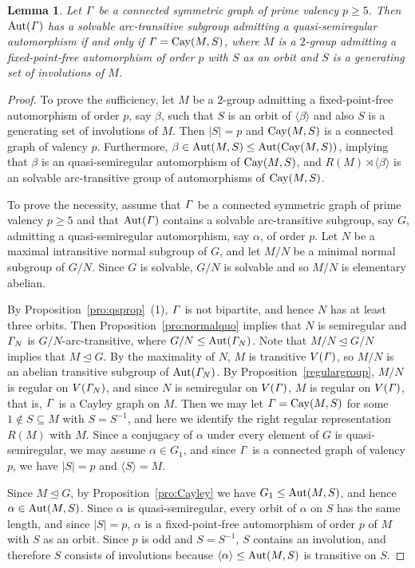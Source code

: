 \documentclass[12pt,reqno]{amsart}
\renewcommand\a{\alpha}  \renewcommand\b{\beta}
\numberwithin {equation} {section}
\newtheorem{lemma}[theorem]{Lemma}
\begin{document}
\begin{lemma}\label{lm:valp1}
 Let ${\it \Gamma}$ be a connected symmetric graph of prime valency $p\geq 5$. Then $\mathrm{Aut}({\it \Gamma})$ has a solvable arc-transitive subgroup admitting a quasi-semiregular automorphism if and only if ${\it \Gamma}=\mathrm{Cay}(M,S)$, where $M$ is a $2$-group admitting a fixed-point-free automorphism of order $p$ with $S$ as an orbit and $S$ is a generating set of involutions of $M$.
 \end{lemma}
\begin{proof} To prove the sufficiency, let $M$ be a $2$-group admitting a fixed-point-free automorphism of order $p$, say $\b$, such that $S$ is an orbit of $\langle \b\rangle$ and also $S$ is a generating set of involutions of $M$. Then $|S|=p$ and $\mathrm{Cay}(M,S)$
is a connected graph of valency $p$. Furthermore, $\b\in \Aut(M,S)\leq \Aut(\Cay(M,S))$, implying that $\b$ is an quasi-semiregular automorphism of $\mathrm{Cay}(M,S)$, and $R(M)\rtimes \langle \b\rangle$ is an solvable arc-transitive group of automorphisms of $\mathrm{Cay}(M,S)$.

To prove the necessity, assume that ${\it \Gamma}$ be a connected symmetric graph of prime valency $p\geq 5$ and that $\mathrm{Aut}({\it \Gamma})$ contains a solvable arc-transitive subgroup, say $G$, admitting a quasi-semiregular automorphism, say $\a$, of order $p$. Let $N$ be a maximal intransitive normal subgroup of $G$, and let $M/N$ be a minimal normal subgroup of $G/N$. Since $G$ is solvable, $G/N$ is solvable and so $M/N$ is elementary abelian.

By Proposition~\ref{pro:qsprop}~(1), ${\it \Gamma}$ is not bipartite, and hence $N$ has at least three orbits. Then Proposition~\ref{pro:normalquo} implies that $N$ is semiregular and ${\it \Gamma}_N$ is $G/N$-arc-transitive, where $G/N\leq \mathrm{Aut}({\it \Gamma}_N)$. Note that $M/N\unlhd G/N$ implies that $M\unlhd G$. By the maximality of $N$, $M$ is transitive $V({\it \Gamma})$, so $M/N$ is an abelian transitive subgroup of $\mathrm{Aut}({\it \Gamma}_N)$. By Proposition~\ref{regulargroup}, $M/N$ is regular on $V({\it \Gamma}_N)$, and since $N$ is semiregular on $V({\it \Gamma})$, $M$ is regular on $V({\it \Gamma})$, that is, ${\it \Gamma}$ is a Cayley graph on $M$. Then we may let ${\it \Gamma}=\mathrm{Cay}(M,S)$ for some $1\not\in S \subseteq M$ with $S=S^{-1}$, and here we identify the right regular representation $R(M)$ with $M$. Since a conjugacy of $\a$ under every element of $G$ is quasi-semiregular, we may assume $\a\in G_1$, and since ${\it \Gamma}$ is a connected graph of valency $p$, we have $|S|=p$ and $\langle S\rangle=M$.

Since $M\unlhd G$, by Proposition~\ref{pro:Cayley} we have $G_1\leq \mathrm{Aut}(M,S)$, and hence $\a\in \Aut(M,S)$. Since $\a$ is quasi-semiregular, every orbit of $\a$ on $S$ has the same length, and since $|S|=p$, $\a$ is a fixed-point-free automorphism of order $p$ of $M$ with $S$ as an orbit. Since $p$ is odd and $S=S^{-1}$, $S$ contains an involution, and therefore $S$ consists of involutions because $\langle \a\rangle\leq \Aut(M,S)$ is transitive on $S$.
\end{proof}
\end{document}
